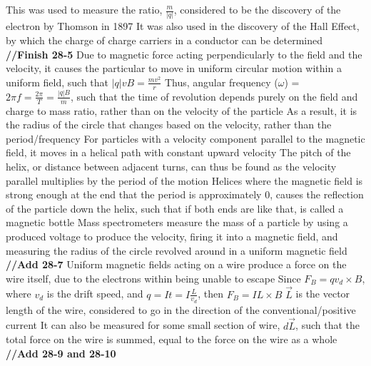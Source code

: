 \documentclass[11 pt, twoside]{article}
\newenvironment{outline*}
{
	\begin{outline}[enumerate]
	}
	{\end{outline}
}
\begin{document}
\begin{outline*}
\3 This was used to measure the ratio, $\frac{m}{|q|}$, considered to be the discovery of the electron by Thomson in 1897
\2 It was also used in the discovery of the Hall Effect, by which the charge of charge carriers in a conductor can be determined
\3 \textbf{//Finish 28-5}
\1 Due to magnetic force acting perpendicularly to the field and the velocity, it causes the particular to move in uniform circular motion within a uniform field, such that $|q|vB = \frac{mv^2}{r}$
\2 Thus, angular frequency ($\omega$) = $2\pi f = \frac{2\pi}{T} = \frac{|q|B}{m}$, such that the time of revolution depends purely on the field and charge to mass ratio, rather than on the velocity of the particle
\3 As a result, it is the radius of the circle that changes based on the velocity, rather than the period/frequency
\2 For particles with a velocity component parallel to the magnetic field, it moves in a helical path with constant upward velocity
\3 The pitch of the helix, or distance between adjacent turns, can thus be found as the velocity parallel multiplies by the period of the motion
\3 Helices where the magnetic field is strong enough at the end that the period is approximately 0, causes the reflection of the particle down the helix, such that if both ends are like that, is called a magnetic bottle
\2 Mass spectrometers measure the mass of a particle by using a produced voltage to produce the velocity, firing it into a magnetic field, and measuring the radius of the circle revolved around in a uniform magnetic field
\1 \textbf{//Add 28-7}
\1 Uniform magnetic fields acting on a wire produce a force on the wire itself, due to the electrons within being unable to escape
\2 Since $F_B = qv_d \times B$, where $v_d$ is the drift speed, and $q = It = I\frac{L}{v_d}$, then $F_B = IL\times B$
\3 $\vec{L}$ is the vector length of the wire, considered to go in the direction of the conventional/positive current
\2 It can also be measured for some small section of wire, $d\vec{L}$, such that the total force on the wire is summed, equal to the force on the wire as a whole
\1 \textbf{//Add 28-9 and 28-10}
\end{outline*}
\end{document}
